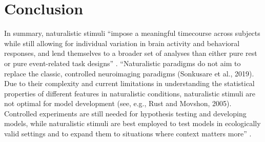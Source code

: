 \section{Conclusion}
%
In summary, naturalistic stimuli ``impose a meaningful timecourse across
subjects while still allowing for individual variation in brain activity and
behavioral responses, and lend themselves to a broader set of analyses than
either pure rest or pure event-related task designs'' \citep{finn2017can}.
%
``Naturalistic paradigms do not aim to replace the classic, controlled
neuroimaging paradigms (Sonkusare et al., 2019). Due to their complexity and
current limitations in understanding the statistical properties of different
features in naturalistic conditions, naturalistic stimuli are not optimal for
model development (see, e.g., Rust and Movshon, 2005). Controlled experiments
are still needed for hypothesis testing and developing models, while
naturalistic stimuli are best employed to test models in ecologically valid
settings and to expand them to situations where context matters
more'' \citep{saarimaki2021naturalistic}.
